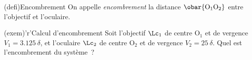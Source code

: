 \documentclass[../../main/main.tex]{subfiles}
\begin{document}
\begin{tcbraster}[raster columns=4, raster equal height=rows]
	\begin{tcb}[label=def:encombrement](defi){Encombrement}
		On appelle \textit{encombrement} la distance $\obar{\rm O_1O_2}$ entre
		l'objectif et l'oculaire.
	\end{tcb}
	\begin{tcb}[label=exem:encombrement,
			raster multicolumn=3](exem)'r'{Calcul d'encombrement}
		Soit l'objectif $\Lc_1$ de centre O$_1$ et de vergence $V_1 =
			\SI{3.125}{\delta}$, et l'oculaire $\Lc_2$ de centre O$_2$ et de
		vergence $V_2 = \SI{25}{\delta}$. Quel est l'encombrement du système~?
		\tcblower
		\begin{isd}
			\tcblower
			\vspace{-1cm}
		\end{isd}
	\end{tcb}
\end{tcbraster}
\end{document}
